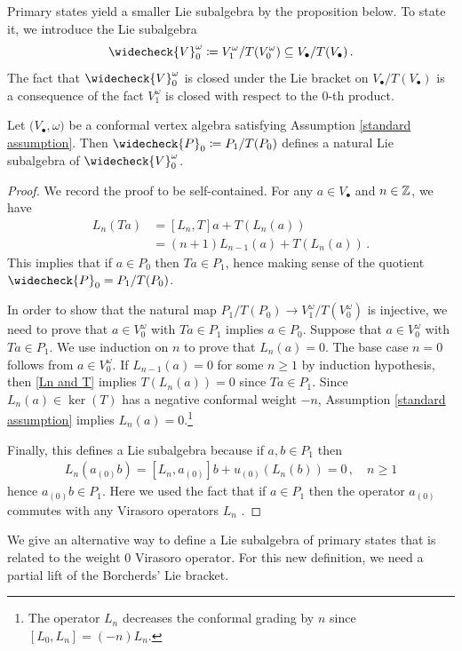 \documentclass[a4paper, 12pt]{amsart}
\begin{document}
Primary states yield a smaller Lie subalgebra by the proposition below. To state it, we introduce the Lie subalgebra 
\[\widecheck{V}_0^\omega\coloneqq V_1^\omega/T(V_0^\omega)\subseteq V_\bullet/T(V_\bullet)\,.\]
The fact that $\widecheck{V}_0^\omega$ is closed under the Lie bracket on $V_\bullet/T(V_\bullet)$ is a consequence of the fact $V_1^\omega$ is closed with respect to the $0$-th product.
\begin{proposition}\label{prop: wallcrossingcompatibility1}
Let $\big(V_\bullet,\omega\big)$ be a conformal vertex algebra satisfying Assumption \ref{standard assumption}. Then $\widecheck{P}_0\coloneqq P_1/T(P_0)$ defines a natural Lie subalgebra of $\widecheck{V}_0^\omega$. 
\end{proposition}
\begin{proof}
We record the proof to be self-contained. For any $a\in V_\bullet$ and $n\in {\mathbb{Z}}$, we have 
\begin{align}\label{Ln and T}
    L_n(Ta)
    &=[L_n, T]a+T(L_n(a))\\
    &=(n+1)L_{n-1}(a)+T(L_n(a))\,.\nonumber
\end{align}
This implies that if $a\in P_0$ then $Ta\in P_1$, hence making sense of the quotient $\widecheck{P}_0=P_1/T(P_0)$. 

In order to show that the natural map $P_1/T(P_0)\rightarrow V_1^\omega/T(V_0^\omega)$ is injective, we need to prove that $a\in V_0^\omega$ with $Ta\in P_1$ implies $a\in P_0$. Suppose that $a\in V_0^\omega$ with $Ta\in P_1$. We use induction on $n$ to prove that $L_n(a)=0$. The base case $n=0$ follows from $a\in V_0^\omega$. If $L_{n-1}(a)=0$ for some $n\geq 1$ by induction hypothesis, then \eqref{Ln and T} implies $T(L_n(a))=0$ since $Ta\in P_1$. Since $L_n(a)\in \ker(T)$ has a negative conformal weight $-n$, Assumption \ref{standard assumption} implies $L_n(a)=0$.\footnote{The operator $L_n$ decreases the conformal grading by $n$ since $[L_0,L_n]=(-n)L_n$. } 

Finally, this defines a Lie subalgebra because if $a, b\in P_1$ then
\begin{align*}
    L_n(a_{(0)}b)=[L_n, a_{(0)}]b+u_{(0)}(L_n(b))=0\,,\quad n\geq 1
\end{align*}
hence $a_{(0)}b\in P_1$. Here we used the fact that if $a\in P_1$ then the operator $a_{(0)}$ commutes with any Virasoro operators $L_n$ \cite[Section 5]{Borcherds}.
\end{proof}

We give an alternative way to define a Lie subalgebra of primary states that is related to the weight 0 Virasoro operator. For this new definition, we need a partial lift of the Borcherds' Lie bracket. 
\end{document}
